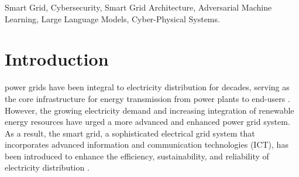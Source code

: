 \documentclass[10pt, journal]{IEEEtran}
\begin{document}

\begin{IEEEkeywords}
Smart Grid, Cybersecurity, Smart Grid Architecture, Adversarial Machine Learning, Large Language Models, Cyber-Physical Systems.
\end{IEEEkeywords}
		
\section{Introduction}

 power grids have been integral to electricity distribution for decades, serving as the core infrastructure for energy transmission from power plants to end-users \cite{amin2005toward}. However, the growing electricity demand and increasing integration of renewable energy resources have urged a more advanced and enhanced power grid system. As a result, the smart grid, a sophisticated electrical grid system that incorporates advanced information and communication technologies (ICT), has been introduced to enhance the efficiency, sustainability, and reliability of electricity distribution \cite{fang2011smart}.
\end{document}
